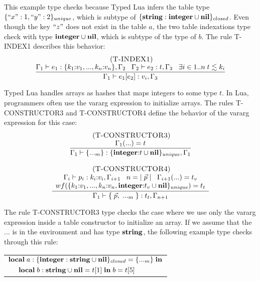 This example type checks because Typed Lua infers the table type
$\{``x":1, ``y":2\}_{unique}$, which is subtype of
$\{\mathbf{string}:\mathbf{integer} \cup \mathbf{nil}\}_{closed}$.
Even though the key $``z"$ does not exist in the table $a$,
the two table indexations type check with type $\mathbf{integer} \cup \mathbf{nil}$,
which is subtype of the type of $b$.
The rule \textsc{T-INDEX1} describes this behavior:
\[
\begin{array}{c}
\; (\textsc{T-INDEX1})\\
\dfrac{\Gamma_{1} \vdash e_{1}:\{k_{1}{:}v_{1}, ..., k_{n}{:}v_{n}\}, \Gamma_{2} \;\;\;
       \Gamma_{2} \vdash e_{2}:t, \Gamma_{3} \;\;\;
       \exists i \in 1{..}n \; t \lesssim k_{i}}
      {\Gamma_{1} \vdash e_{1}[e_{2}]:v_{i}, \Gamma_{3}}
\end{array}
\]

Typed Lua handles arrays as hashes that maps integers to some type $t$.
In Lua, programmers often use the vararg expression to initialize arrays.
The rules \textsc{T-CONSTRUCTOR3} and \textsc{T-CONSTRUCTOR4} define
the behavior of the vararg expression for this case:
\[
\begin{array}{c}
\begin{array}{c}
\; (\textsc{T-CONSTRUCTOR3})\\
\dfrac{\Gamma_{1}({...}) = t}
      {\Gamma_{1} \vdash \{{...}_{m}\}:\{\mathbf{integer}{:}t \cup \mathbf{nil}\}_{unique}, \Gamma_{1}}
\end{array}
\\ \\
\begin{array}{c}
\; (\textsc{T-CONSTRUCTOR4})\\
\dfrac{\begin{array}{c}
       \Gamma_{i} \vdash p_{i}:k_{i}{:}v_{i}, \Gamma_{i+1} \;\;\;
       n = |\;\vec{p}\;| \;\;\;
       \Gamma_{i+1}({...}) = t_{v}\\
       wf(\{k_{1}{:}v_{1}, ..., k_{n}{:}v_{n}, \mathbf{integer}{:}t_{v} \cup \mathbf{nil}\}_{unique}) = t_{t}
       \end{array}}
      {\Gamma_{1} \vdash \{\;\vec{p},\;{...}_{m}\;\}:t_{t}, \Gamma_{n+1}}
\end{array}
\end{array}
\]

The rule \textsc{T-CONSTRUCTOR3} type checks the case where we use
only the vararg expression inside a table constructor to initialize
an array.
If we assume that the $...$ is in the environment and has type $\mathbf{string}$,
the following example type checks through this rule:
\begin{center}
\begin{tabular}{ll}
\multicolumn{2}{l}{$\mathbf{local} \; a:\{\mathbf{integer}:\mathbf{string} \cup \mathbf{nil}\}_{closed} = \{ {...}_{m} \} \; \mathbf{in}$}\\
& \multicolumn{1}{l}{$\mathbf{local} \; b:\mathbf{string} \cup \mathbf{nil} = t[1] \; \mathbf{in} \; b = t[5]$}
\end{tabular}
\end{center}

